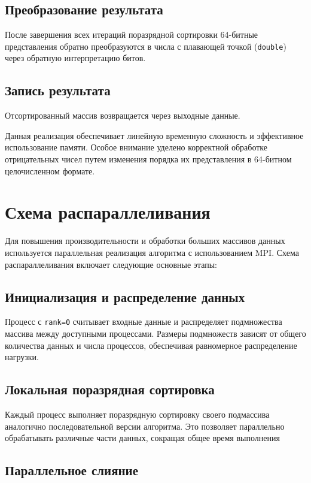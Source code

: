 \documentclass[a4paper,12pt]{article}
\begin{document}
\subsection{Преобразование результата}

После завершения всех итераций поразрядной сортировки 64-битные представления обратно преобразуются в числа с плавающей точкой (\texttt{double}) через обратную интерпретацию битов.

\subsection{Запись результата}

Отсортированный массив возвращается через выходные данные.

Данная реализация обеспечивает линейную временную сложность и эффективное использование памяти. Особое внимание уделено корректной обработке отрицательных чисел путем изменения порядка их представления в 64-битном целочисленном формате.

\section{Схема распараллеливания}

Для повышения производительности и обработки больших массивов данных используется параллельная реализация алгоритма с использованием MPI. Схема распараллеливания включает следующие основные этапы:

\subsection{Инициализация и распределение данных}

Процесс с \texttt{rank=0} считывает входные данные и распределяет подмножества массива между доступными процессами. Размеры подмножеств зависят от общего количества данных и числа процессов, обеспечивая равномерное распределение нагрузки.

\subsection{Локальная поразрядная сортировка}

Каждый процесс выполняет поразрядную сортировку своего подмассива аналогично последовательной версии алгоритма. Это позволяет параллельно обрабатывать различные части данных, сокращая общее время выполнения

\subsection{Параллельное слияние}
\end{document}
